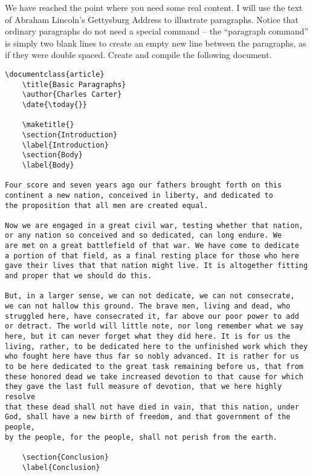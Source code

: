         We have reached the point where you need some real content. I will use the text of Abraham Lincoln's Gettysburg Address to illustrate paragraphs. Notice that ordinary paragraphs do not need a special command -- the ``paragraph command'' is simply two blank lines to create an empty new line between the paragraphs, as if they were double spaced. Create and compile the following document.

        \begin{verbatim}
\documentclass{article}
    \title{Basic Paragraphs}
    \author{Charles Carter}
    \date{\today{}}
 
    \maketitle{}
    \section{Introduction}
    \label{Introduction}
    \section{Body}
    \label{Body}

Four score and seven years ago our fathers brought forth on this 
continent a new nation, conceived in liberty, and dedicated to 
the proposition that all men are created equal.

Now we are engaged in a great civil war, testing whether that nation, 
or any nation so conceived and so dedicated, can long endure. We 
are met on a great battlefield of that war. We have come to dedicate 
a portion of that field, as a final resting place for those who here 
gave their lives that that nation might live. It is altogether fitting 
and proper that we should do this.

But, in a larger sense, we can not dedicate, we can not consecrate, 
we can not hallow this ground. The brave men, living and dead, who 
struggled here, have consecrated it, far above our poor power to add 
or detract. The world will little note, nor long remember what we say 
here, but it can never forget what they did here. It is for us the 
living, rather, to be dedicated here to the unfinished work which they 
who fought here have thus far so nobly advanced. It is rather for us 
to be here dedicated to the great task remaining before us, that from 
these honored dead we take increased devotion to that cause for which 
they gave the last full measure of devotion, that we here highly resolve 
that these dead shall not have died in vain, that this nation, under 
God, shall have a new birth of freedom, and that government of the people, 
by the people, for the people, shall not perish from the earth.

    \section{Conclusion}
    \label{Conclusion}
    
        \end{verbatim}
        
